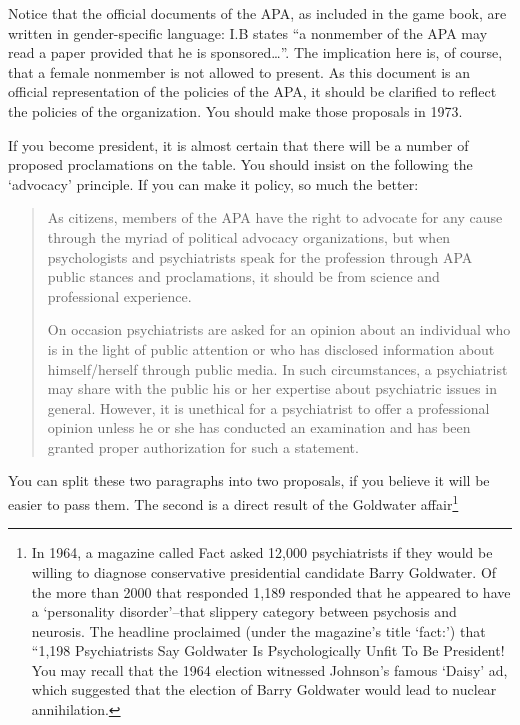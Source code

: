 \begin{refsection}
Notice that the official documents of the APA, as included in the game book, are written in gender-specific language: I.B states “a nonmember of the APA may read a paper provided that he is sponsored{\ldots}”. The implication here is, of course, that a female nonmember is not allowed to present. As this document is an official representation of the policies of the APA, it should be clarified to reflect the policies of the organization. You should make those proposals in 1973.

If you become president, it is almost certain that there will be a number of proposed proclamations on the table. You should insist on the following the `advocacy' principle. If you can make it policy, so much the better:

\begin{quote}

As citizens, members of the APA have the right to advocate for any cause through the myriad of political advocacy organizations, but when psychologists and psychiatrists speak for the profession through APA public stances and proclamations, it should be from science and professional experience.

On occasion psychiatrists are asked for an opinion about an individual who is in the light of public attention or who has disclosed information about himself\slash herself through public media. In such circumstances, a psychiatrist may share with the public his or her expertise about psychiatric issues in general. However, it is unethical for a psychiatrist to offer a professional opinion unless he or she has conducted an examination and has been granted proper authorization for such a statement.
\end{quote}

You can split these two paragraphs into two proposals, if you believe it will be easier to pass them. The second is a direct result of the Goldwater affair\footnote{In 1964, a magazine called Fact asked 12,000 psychiatrists if they would be willing to diagnose conservative presidential candidate Barry Goldwater. Of the more than 2000 that responded 1,189 responded that he appeared to have a `personality disorder'--that slippery category between psychosis and neurosis. The headline proclaimed (under the magazine's title `fact:') that “1,198 Psychiatrists Say Goldwater Is Psychologically Unfit To Be President! You may recall that the 1964 election witnessed Johnson's famous `Daisy' ad, which suggested that the election of Barry Goldwater would lead to nuclear annihilation.⁠

}
\end{refsection}

